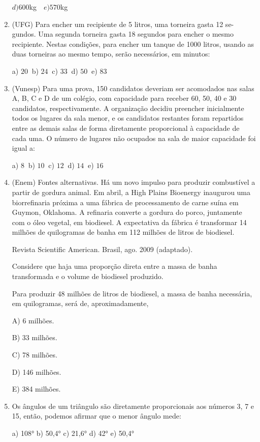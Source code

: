 \begin{multicols*}{2}
\begin{enumerate}
$d)600$kg $ \ \ \ e)570$kg
	
	\item (UFG) Para encher um recipiente de 5 litros, uma torneira gasta 12 se- gundos. Uma segunda torneira gasta 18 segundos para encher o mesmo recipiente. Nestas condições, para encher um tanque de 1000 litros, usando as duas torneiras ao mesmo tempo, serão necessários, em minutos:

	a) $20 \ $ b) $24 \ $ c) $33 \ $ d) $50 \ $ e) $83 $

	\item (Vunesp) Para uma prova, 150 candidatos deveriam ser acomodados nas salas A, B, C e D de um colégio, com capacidade para receber 60, 50, 40 e 30 candidatos, respectivamente. A organização decidiu preencher inicialmente todos os lugares da sala menor, e os candidatos restantes foram repartidos entre as demais salas de forma diretamente proporcional à capacidade de cada uma. O número de lugares não ocupados na sala de maior capacidade foi igual a:

	a) $8 \ $ b) $10 \ $ c) $12 \ $ d) $14 \ $ e) $16 $

	\item (Enem) Fontes alternativas. Há um novo impulso para produzir combustível a partir de gordura animal. Em abril, a High Plains Bioenergy inaugurou uma biorrefinaria próxima a uma fábrica de processamento de carne suína em Guymon, Oklahoma. A refinaria converte a gordura do porco, juntamente com o óleo vegetal, em biodiesel. A expectativa da fábrica é transformar 14 milhões de quilogramas de banha em 112 milhões de litros de biodiesel.

Revista Scientific American. Brasil, ago. 2009 (adaptado).

Considere que haja uma proporção direta entre a massa de banha transformada e o volume de biodiesel produzido.

Para produzir 48 milhões de litros de biodiesel, a massa de banha necessária, em quilogramas, será de, aproximadamente,

A) 6 milhões.

B) 33 milhões.

C) 78 milhões.

D) 146 milhões.

E) 384 milhões.

	\item Os ângulos de um triângulo são diretamente proporcionais aos números 3, 7 e 15, então, podemos afirmar que o menor ângulo mede:
	
	a) 108°  b) 50,4°  c) 21,6°  d) 42°  e) 50,4°


\end{enumerate}
\end{multicols*}
